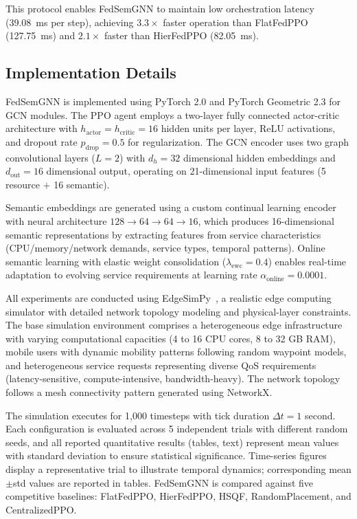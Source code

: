 \documentclass[conference]{IEEEtran}
\begin{document}
	This protocol enables FedSemGNN to maintain low orchestration latency (39.08~ms per step), achieving $3.3\times$ faster operation than FlatFedPPO (127.75~ms) and $2.1\times$ faster than HierFedPPO (82.05~ms).
	
	\subsection{Implementation Details}
	FedSemGNN is implemented using PyTorch 2.0 and PyTorch Geometric 2.3 for GCN modules. The PPO agent employs a two-layer fully connected actor-critic architecture with $h_{\text{actor}} = h_{\text{critic}} = 16$ hidden units per layer, ReLU activations, and dropout rate $p_{\text{drop}} = 0.5$ for regularization. The GCN encoder uses two graph convolutional layers ($L = 2$) with $d_h = 32$ dimensional hidden embeddings and $d_{\text{out}} = 16$ dimensional output, operating on 21-dimensional input features (5 resource $+$ 16 semantic).
	
	Semantic embeddings are generated using a custom continual learning encoder with neural architecture $128 \rightarrow 64 \rightarrow 64 \rightarrow 16$, which produces 16-dimensional semantic representations by extracting features from service characteristics (CPU/memory/network demands, service types, temporal patterns). Online semantic learning with elastic weight consolidation ($\lambda_{\text{ewc}} = 0.4$) enables real-time adaptation to evolving service requirements at learning rate $\alpha_{\text{online}} = 0.0001$.
	
	All experiments are conducted using EdgeSimPy~\cite{souza2023edgesimpy}, a realistic edge computing simulator with detailed network topology modeling and physical-layer constraints. The base simulation environment comprises a heterogeneous edge infrastructure with varying computational capacities (4 to 16 CPU cores, 8 to 32 GB RAM), mobile users with dynamic mobility patterns following random waypoint models, and heterogeneous service requests representing diverse QoS requirements (latency-sensitive, compute-intensive, bandwidth-heavy). The network topology follows a mesh connectivity pattern generated using NetworkX.
	
	The simulation executes for 1,000 timesteps with tick duration $\Delta t = 1$ second. Each configuration is evaluated across 5 independent trials with different random seeds, and all reported quantitative results (tables, text) represent mean values with standard deviation to ensure statistical significance. Time-series figures display a representative trial to illustrate temporal dynamics; corresponding mean$\pm$std values are reported in tables. FedSemGNN is compared against five competitive baselines: FlatFedPPO, HierFedPPO, HSQF, RandomPlacement, and CentralizedPPO.
	
\end{document}
